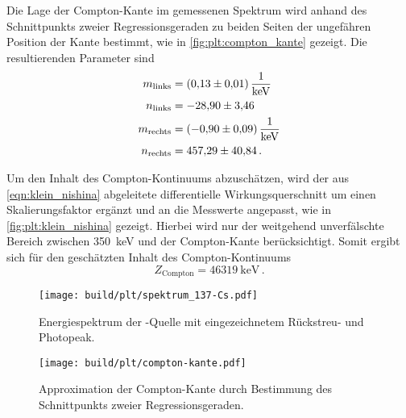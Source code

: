 Die Lage der Compton-Kante im gemessenen Spektrum wird anhand des Schnittpunkts zweier Regressionsgeraden zu beiden Seiten der ungefähren Position der Kante bestimmt,
wie in \autoref{fig:plt:compton_kante} gezeigt.
Die resultierenden Parameter sind
\begin{align*}
    m_\text{links} &= \SI{0.13 \pm 0.01}{\per\kilo\electronvolt} \\
    n_\text{links} &= \num{-28.90 \pm 3.46} \\
    m_\text{rechts} &= \SI{-0.90 \pm 0.09}{\per\kilo\electronvolt} \\
    n_\text{rechts} &= \num{457.29 \pm 40.84} \, .
\end{align*}

Um den Inhalt des Compton-Kontinuums abzuschätzen,
wird der aus \autoref{eqn:klein_nishina} abgeleitete differentielle Wirkungsquerschnitt
um einen Skalierungsfaktor ergänzt und
an die Messwerte angepasst,
    wie in \autoref{fig:plt:klein_nishina} gezeigt.
Hierbei wird nur der weitgehend unverfälschte Bereich zwischen \SI{350}{\kilo\electronvolt} und der Compton-Kante berücksichtigt.
Somit ergibt sich für den geschätzten Inhalt des Compton-Kontinuums
\begin{equation*}
    Z_\text{Compton} = \SI{46319}{\kilo\electronvolt} \, .
\end{equation*}



\begin{figure}
    \centering
    \texttt{[image: build/plt/spektrum\_137-Cs.pdf]}
    \caption{Energiespektrum der -Quelle mit eingezeichnetem Rückstreu- und Photopeak.}
    \label{fig:plt:spektrum_Cs_137}
\end{figure}

\begin{figure}
    \centering
    \texttt{[image: build/plt/compton-kante.pdf]}
    \caption{Approximation der Compton-Kante durch Bestimmung des Schnittpunkts zweier Regressionsgeraden.}
    \label{fig:plt:compton_kante}
\end{figure}

